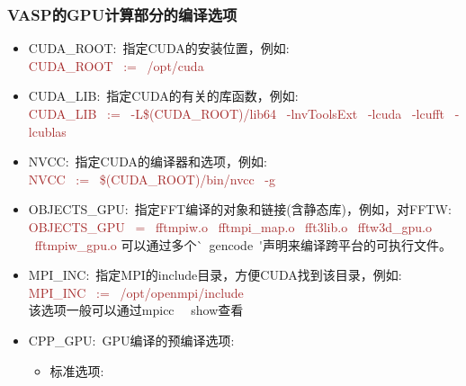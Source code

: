 \subsubsection{\rm{VASP的GPU计算部分的编译选项}}
\begin{itemize}
	\item \textrm{CUDA\_ROOT}:~指定\textrm{CUDA}的安装位置，例如:\\
\textcolor{brown}{\textrm{CUDA\_ROOT~ :=~ /opt/cuda }}
	\item \textrm{CUDA\_LIB}:~指定\textrm{CUDA}的有关的库函数，例如:\\
\textcolor{brown}{\textrm{CUDA\_LIB~ :=~ -L\$(CUDA\_ROOT)/lib64 ~-lnvToolsExt ~-lcuda ~-lcufft ~-lcublas}}
	\item \textrm{NVCC}:~指定\textrm{CUDA}的编译器和选项，例如:\\
		\textcolor{brown}{\textrm{NVCC~ :=~ \$(CUDA\_ROOT)/bin/nvcc ~-g }}
	\item \textrm{OBJECTS\_GPU}:~指定\textrm{FFT}编译的对象和链接(含静态库)，例如，对\textrm{FFTW}:\\
\textcolor{brown}{\textrm{OBJECTS\_GPU~ =~ fftmpiw.o ~fftmpi\_map.o ~fft3lib.o ~fftw3d\_gpu.o ~fftmpiw\_gpu.o}}
可以通过多个\textrm{\`~gencode~\'}声明来编译跨平台的可执行文件。
	\item \textrm{MPI\_INC}:~指定\textrm{MPI}的\textrm{include}目录，方便\textrm{CUDA}找到该目录，例如:\\
\textcolor{brown}{\textrm{MPI\_INC~ :=~ /opt/openmpi/include}}\\
该选项一般可以通过\textrm{mpicc ~~\-\-show}查看
	\item \textrm{CPP\_GPU}:~\textrm{GPU}编译的预编译选项:
		\begin{itemize}
			\item 标准选项:\\

\end{itemize}
\end{itemize}
